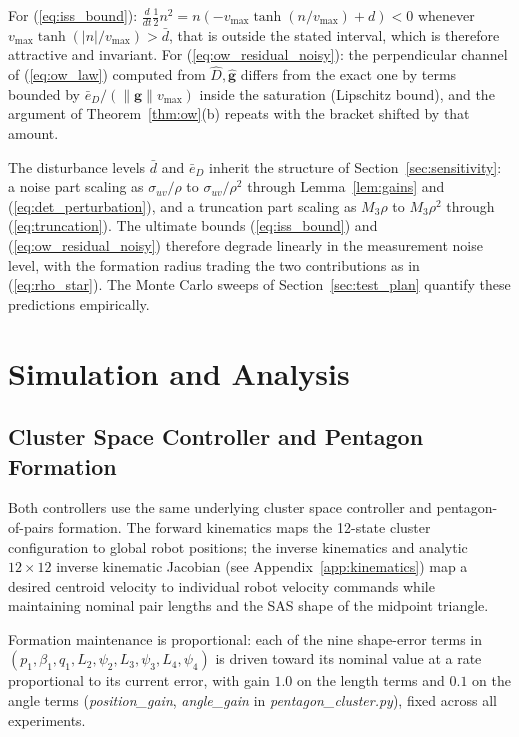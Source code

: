 \documentclass[lettersize,journal]{IEEEtran}
\begin{document}
\begin{IEEEproof}
For (\ref{eq:iss_bound}): $\tfrac{d}{dt}\tfrac{1}{2}n^2 = n(-v_{\max}
\tanh(n/v_{\max}) + d) < 0$ whenever $v_{\max}\tanh(|n|/v_{\max}) >
\bar{d}$, that is outside the stated interval, which is therefore
attractive and invariant. For (\ref{eq:ow_residual_noisy}): the
perpendicular channel of (\ref{eq:ow_law}) computed from $\hat{D},
\hat{\mathbf{g}}$ differs from the exact one by terms bounded by
$\bar{e}_D/(\|\mathbf{g}\|v_{\max})$ inside the saturation (Lipschitz
bound), and the argument of Theorem~\ref{thm:ow}(b) repeats with the
bracket shifted by that amount.
\end{IEEEproof}

The disturbance levels $\bar{d}$ and $\bar{e}_D$ inherit the structure
of Section~\ref{sec:sensitivity}: a noise part scaling as
$\sigma_{uv}/\rho$ to $\sigma_{uv}/\rho^2$ through Lemma~\ref{lem:gains}
and (\ref{eq:det_perturbation}), and a truncation part scaling as
$M_3\rho$ to $M_3\rho^2$ through (\ref{eq:truncation}). The ultimate
bounds (\ref{eq:iss_bound}) and (\ref{eq:ow_residual_noisy}) therefore
degrade linearly in the measurement noise level, with the formation
radius trading the two contributions as in (\ref{eq:rho_star}). The
Monte Carlo sweeps of Section~\ref{sec:test_plan} quantify these
predictions empirically.


\section{Simulation and Analysis}
\label{sec:methods}

\subsection{Cluster Space Controller and Pentagon Formation}

Both controllers use the same underlying cluster space controller and
pentagon-of-pairs formation. The forward kinematics maps the 12-state
cluster configuration to global robot positions; the inverse kinematics
and analytic $12 \times 12$ inverse kinematic Jacobian (see
Appendix~\ref{app:kinematics}) map a desired centroid velocity to
individual robot velocity commands while maintaining nominal pair lengths
and the SAS shape of the midpoint triangle.

Formation maintenance is proportional: each of the nine shape-error
terms in $(p_1, \beta_1, q_1, L_2, \psi_2, L_3, \psi_3, L_4, \psi_4)$ is
driven toward its nominal value at a rate proportional to its current
error, with gain $1.0$ on the length terms and $0.1$ on the angle terms
(\textit{position\_gain}, \textit{angle\_gain} in
\textit{pentagon\_cluster.py}), fixed across all experiments.
\end{document}
